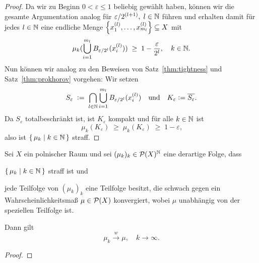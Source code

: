 \documentclass[../main/main.tex]{subfiles}
\begin{document}
\begin{proof}
		Da wir zu Beginn $0 < \varepsilon \leq 1$ beliebig gewählt haben, können wir die gesamte Argumentation analog für $\varepsilon/2^{(l+1)}, \; l \in \mathbb{N}$ führen und erhalten damit für jedes $l \in \mathbb{N}$ 
		eine endliche Menge $\left\{x_1^{(l)}, \dots, x_{m_l}^{(l)}\right\} \subseteq X$ mit
		\[ \mu_k(\bigcup_{i=1}^{m_l} B_{\varepsilon/2^l}(x_i^{(l)})) \; \geq \; 1 - \frac{\varepsilon}{2^l}, \quad k \in \mathbb{N} \text{.} \]
		Nun können wir analog zu den Beweisen von Satz~\ref{thm:tightness} und Satz~\ref{thm:prokhorov} vorgehen:
		Wir setzen
		\[ S_{\varepsilon} \; \vcentcolon = \; \bigcap_{l \in \mathbb{N}} \bigcup_{i=1}^{m_l} B_{\varepsilon/2^l}(x_i^{(l)}) \quad \text{und} \quad K_{\varepsilon} \vcentcolon = \overline{S_\varepsilon} \text{.} \]
		Da $S_{\varepsilon}$ totalbeschränkt ist, ist $K_{\varepsilon}$ kompakt und für alle $k \in \mathbb{N}$ ist
		\[ \mu_k(K_{\varepsilon}) \; \geq \; \mu_k(K_{\varepsilon}) \; \geq \; 1 - \varepsilon \text{,} \]
		also ist $\left\{\, \mu_k \; \middle| \; k \in \mathbb{N} \,\right\}$ straff.
	\end{proof}

	\begin{Hilfssatz}
		\label{lem:subsequenceofsubsequence}
		Sei $X$ ein polnischer Raum und sei $(\mu_k)_k \in \mathcal{P}(X)^{\mathbb{N}}$ eine derartige Folge, dass 
		\begin{itemizethm}
			\item $\left\{\, \mu_k \; \middle| \; k \in \mathbb{N} \,\right\}$ straff ist und
			\item jede Teilfolge von $(\mu_k)_k$ eine Teilfolge besitzt, die schwach gegen ein Wahrscheinlichkeitsmaß $\mu \in \mathcal{P}(X)$ konvergiert, wobei $\mu$ unabhängig von der speziellen Teilfolge ist.
		\end{itemizethm}
		Dann gilt \[\mu_k \xrightarrow{w} \mu, \quad k \to \infty \text{.} \]
	\end{Hilfssatz}

	\begin{proof}
	\end{proof}
\end{document}
